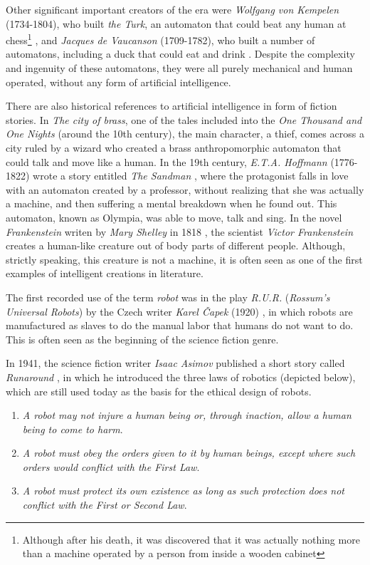Other significant important creators of the era were \textit{Wolfgang von Kempelen} (1734-1804), who built \textit{the Turk}, an automaton that could beat any human at chess\footnote{Although after his death, it was discovered that it was actually nothing more than a machine operated by a person from inside a wooden cabinet} \autocite{jay2000}, 
and \textit{Jacques de Vaucanson} (1709-1782), who built a number of automatons, including a duck that could eat and drink \autocite{nils2009, trymbaka2022}. Despite the complexity and ingenuity of these automatons, they were all purely mechanical and human operated, without any form of artificial intelligence.

There are also historical references to artificial intelligence in form of fiction stories. In \textit{The city of brass}, one of the tales included into the \textit{One Thousand and One Nights} (around the 10th century), the main character, a thief, comes across a city ruled by a wizard who created a brass anthropomorphic automaton that could talk and move like a human. In the 19th century, \textit{E.T.A. Hoffmann} (1776-1822) wrote a story entitled \textit{The Sandman} \autocite{hoffmann1816}, where the protagonist falls in love with an automaton created by a professor, without realizing that she was actually a machine, and then suffering a mental breakdown when he found out. This automaton, known as Olympia, was able to move, talk and sing. In the novel \textit{Frankenstein} writen by \textit{Mary Shelley} in 1818 \autocite{shelley1994}, the scientist \textit{Victor Frankenstein} creates a human-like creature out of body parts of different people. Although, strictly speaking, this creature is not a machine, it is often seen as one of the first examples of intelligent creations in literature.

The first recorded use of the term \textit{robot} was in the play \textit{R.U.R.} (\textit{Rossum’s Universal Robots}) by the Czech writer \textit{Karel Čapek} (1920) \autocite{nils2009}, in which robots are manufactured as slaves to do the manual labor that humans do not want to do. This is often seen as the beginning of the science fiction genre.

In 1941, the science fiction writer \textit{Isaac Asimov} published a short story called \textit{Runaround} \autocite{nils2009}, in which he introduced the three laws of robotics (depicted below), which are still used today as the basis for the ethical design of robots.


\begin{enumerate}

	\item \textit{A robot may not injure a human being or, through inaction, allow a human being to come to harm}.

	\item \textit{A robot must obey the orders given to it by human beings, except where such orders would conflict with the First Law}.

	\item \textit{A robot must protect its own existence as long as such protection does not conflict with the First or Second Law}.

\end{enumerate}

